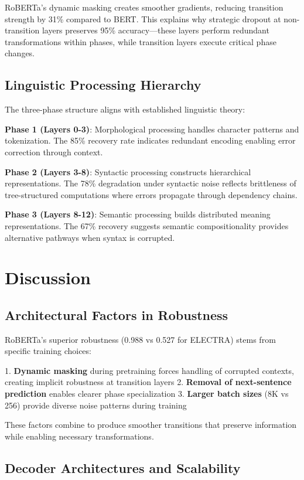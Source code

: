 \documentclass{article}
\begin{document}
RoBERTa's dynamic masking creates smoother gradients, reducing transition strength by 31\% compared to BERT. This explains why strategic dropout at non-transition layers preserves 95\% accuracy—these layers perform redundant transformations within phases, while transition layers execute critical phase changes.

\subsection{Linguistic Processing Hierarchy}

The three-phase structure aligns with established linguistic theory:

\textbf{Phase 1 (Layers 0-3)}: Morphological processing handles character patterns and tokenization. The 85\% recovery rate indicates redundant encoding enabling error correction through context.

\textbf{Phase 2 (Layers 3-8)}: Syntactic processing constructs hierarchical representations. The 78\% degradation under syntactic noise reflects brittleness of tree-structured computations where errors propagate through dependency chains.

\textbf{Phase 3 (Layers 8-12)}: Semantic processing builds distributed meaning representations. The 67\% recovery suggests semantic compositionality provides alternative pathways when syntax is corrupted.

\section{Discussion}

\subsection{Architectural Factors in Robustness}

RoBERTa's superior robustness (0.988 vs 0.527 for ELECTRA) stems from specific training choices:

1. \textbf{Dynamic masking} during pretraining forces handling of corrupted contexts, creating implicit robustness at transition layers
2. \textbf{Removal of next-sentence prediction} enables clearer phase specialization
3. \textbf{Larger batch sizes} (8K vs 256) provide diverse noise patterns during training

These factors combine to produce smoother transitions that preserve information while enabling necessary transformations.

\subsection{Decoder Architectures and Scalability}
\end{document}
